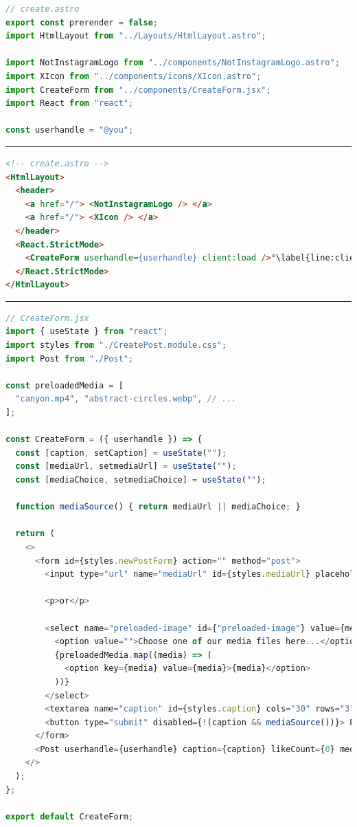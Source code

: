 \documentclass[a4paper, 12pt]{article}
\begin{document}
\vspace{1cm}
\begin{lstlisting}[caption=Create page in Astro (Frontmatter), label={lst:Astro:Create:Script}, language=JavaScript]
// create.astro 
export const prerender = false;
import HtmlLayout from "../Layouts/HtmlLayout.astro";
  
import NotInstagramLogo from "../components/NotInstagramLogo.astro";
import XIcon from "../components/icons/XIcon.astro";
import CreateForm from "../components/CreateForm.jsx";
import React from "react";

const userhandle = "@you";
\end{lstlisting}
\hrule
\begin{lstlisting}[caption=Create page in Astro (HTML), label={lst:Astro:Create:HTML}, language=HTML, firstnumber=11, escapechar=°]
<!-- create.astro -->
<HtmlLayout>
  <header>
    <a href="/"> <NotInstagramLogo /> </a>
    <a href="/"> <XIcon /> </a>
  </header>
  <React.StrictMode>
    <CreateForm userhandle={userhandle} client:load />°\label{line:clientLoad}°
  </React.StrictMode>
</HtmlLayout>
\end{lstlisting}
\hrule
\begin{lstlisting}[caption=Create form in Astro, label={lst:Astro:Createform}, language=JavaScript]
// CreateForm.jsx
import { useState } from "react";
import styles from "./CreatePost.module.css";
import Post from "./Post";

const preloadedMedia = [
  "canyon.mp4", "abstract-circles.webp", // ...
];

const CreateForm = ({ userhandle }) => {
  const [caption, setCaption] = useState("");
  const [mediaUrl, setmediaUrl] = useState("");
  const [mediaChoice, setmediaChoice] = useState("");

  function mediaSource() { return mediaUrl || mediaChoice; }

  return (
    <>
      <form id={styles.newPostForm} action="" method="post">
        <input type="url" name="mediaUrl" id={styles.mediaUrl} placeholder="Insert your media URL here..." value={mediaUrl} onChange={(event) => setmediaUrl(event.target.value)} />

        <p>or</p>

        <select name="preloaded-image" id={"preloaded-image"} value={mediaChoice} onChange={(event) => setmediaChoice(event.target.value)}>
          <option value="">Choose one of our media files here...</option>
          {preloadedMedia.map((media) => (
            <option key={media} value={media}>{media}</option>
          ))}
        </select>
        <textarea name="caption" id={styles.caption} cols="30" rows="3" placeholder="Type your caption here" value={caption} onChange={(event) => setCaption(event.target.value)}/>
        <button type="submit" disabled={!(caption && mediaSource())}> Post it! </button>
      </form>
      <Post userhandle={userhandle} caption={caption} likeCount={0} mediaSource={mediaSource()} hideActionIcons={true} />
    </>
  );
};

export default CreateForm;
\end{lstlisting}
\vspace{1cm}
\end{document}
